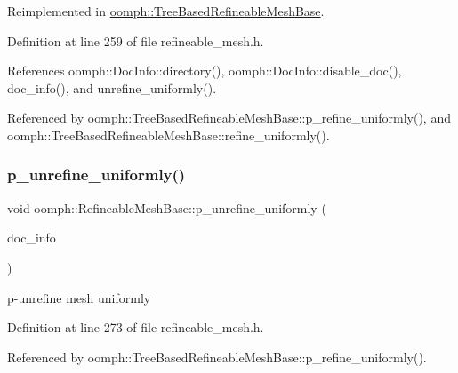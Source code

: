 Reimplemented in \hyperlink{classoomph_1_1TreeBasedRefineableMeshBase_ae922698aeb358f174c37dac5101c5369}{oomph\+::\+Tree\+Based\+Refineable\+Mesh\+Base}.



Definition at line 259 of file refineable\+\_\+mesh.\+h.



References oomph\+::\+Doc\+Info\+::directory(), oomph\+::\+Doc\+Info\+::disable\+\_\+doc(), doc\+\_\+info(), and unrefine\+\_\+uniformly().



Referenced by oomph\+::\+Tree\+Based\+Refineable\+Mesh\+Base\+::p\+\_\+refine\+\_\+uniformly(), and oomph\+::\+Tree\+Based\+Refineable\+Mesh\+Base\+::refine\+\_\+uniformly().

\mbox{\label{classoomph_1_1RefineableMeshBase_a6a59e7e2e6caac875091a15e79487953}} 
\subsubsection{\texorpdfstring{p\+\_\+unrefine\+\_\+uniformly()}{p\_unrefine\_uniformly()}}
{\footnotesize\ttfamily void oomph\+::\+Refineable\+Mesh\+Base\+::p\+\_\+unrefine\+\_\+uniformly (\begin{DoxyParamCaption}\item[{\hyperlink{classoomph_1_1DocInfo}{Doc\+Info} \&}]{doc\+\_\+info }\end{DoxyParamCaption})\hspace{0.3cm}{\ttfamily [inline]}}



p-\/unrefine mesh uniformly 



Definition at line 273 of file refineable\+\_\+mesh.\+h.



Referenced by oomph\+::\+Tree\+Based\+Refineable\+Mesh\+Base\+::p\+\_\+refine\+\_\+uniformly().

\mbox{\label{classoomph_1_1RefineableMeshBase_afe5810e718ce1939f3f81e3eb5743768}} 

